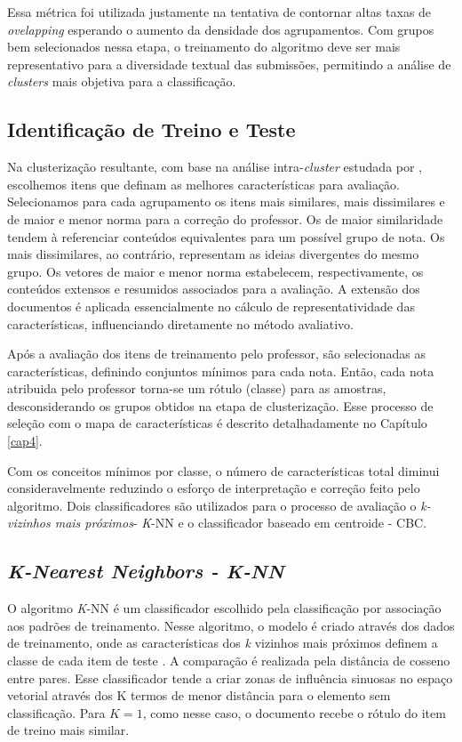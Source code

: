 Essa métrica foi utilizada justamente na tentativa de contornar altas taxas de \textit{ovelapping} esperando o aumento da densidade dos agrupamentos. Com grupos bem selecionados nessa etapa, o treinamento do algoritmo deve ser mais representativo para a diversidade textual das submissões, permitindo a análise de \textit{clusters} mais objetiva para a classificação.

\subsection{Identificação de Treino e Teste}
Na clusterização resultante, com base na análise intra-\textit{cluster} estudada por , escolhemos itens que definam as melhores características para avaliação. Selecionamos para cada agrupamento os itens mais similares, mais dissimilares e de maior e menor norma para a correção do professor. Os de maior similaridade tendem à referenciar conteúdos equivalentes para um possível grupo de nota. Os mais dissimilares, ao contrário, representam as ideias divergentes do mesmo grupo. Os vetores de maior e menor norma estabelecem, respectivamente, os conteúdos extensos e resumidos associados para a avaliação. A extensão dos documentos é aplicada essencialmente no cálculo de representatividade das características, influenciando diretamente no método avaliativo.

Após a avaliação dos itens de treinamento pelo professor, são selecionadas as características, definindo conjuntos mínimos para cada nota. Então, cada nota atribuida pelo professor torna-se um rótulo (classe) para as amostras, desconsiderando os grupos obtidos na etapa de clusterização. Esse processo de seleção com o mapa de características é descrito detalhadamente no Capítulo \ref{cap4}.

Com os conceitos mínimos por classe, o número de características total diminui consideravelmente reduzindo o esforço de interpretação e correção feito pelo algoritmo. Dois classificadores são utilizados para o processo de avaliação o \textit{k-vizinhos mais próximos}- \textit{K}-NN e o classificador baseado em centroide - CBC.
 
\subsection{{\it K-Nearest Neighbors - K-NN}} \label{knn}
O algoritmo \textit{K}-NN é um classificador escolhido pela classificação por associação aos padrões de treinamento. Nesse algoritmo, o modelo é criado através dos dados de treinamento, onde as características dos \textit{k} vizinhos mais próximos definem a classe de cada item de teste \cite{baeza2011}. A comparação é realizada pela distância de cosseno entre pares. Esse classificador tende a criar zonas de influência sinuosas no espaço vetorial através dos K termos de menor distância para o elemento sem classificação. Para $ K = 1 $, como nesse caso, o documento recebe o rótulo do item de treino mais similar.

